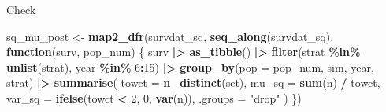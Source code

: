 \documentclass[
]{article}
\newenvironment{Shaded}{\begin{snugshade}}{\end{snugshade}}
\newcommand{\AttributeTok}[1]{\textcolor[rgb]{0.13,0.29,0.53}{#1}}
\newcommand{\ControlFlowTok}[1]{\textcolor[rgb]{0.13,0.29,0.53}{\textbf{#1}}}
\newcommand{\DecValTok}[1]{\textcolor[rgb]{0.00,0.00,0.81}{#1}}
\newcommand{\FunctionTok}[1]{\textcolor[rgb]{0.13,0.29,0.53}{\textbf{#1}}}
\newcommand{\NormalTok}[1]{#1}
\newcommand{\OtherTok}[1]{\textcolor[rgb]{0.56,0.35,0.01}{#1}}
\newcommand{\SpecialCharTok}[1]{\textcolor[rgb]{0.81,0.36,0.00}{\textbf{#1}}}
\newcommand{\StringTok}[1]{\textcolor[rgb]{0.31,0.60,0.02}{#1}}
\begin{document}
Check

\begin{Shaded}
\begin{Highlighting}[]
\NormalTok{sq\_mu\_post }\OtherTok{\textless{}{-}} \FunctionTok{map2\_dfr}\NormalTok{(survdat\_sq, }\FunctionTok{seq\_along}\NormalTok{(survdat\_sq), }\ControlFlowTok{function}\NormalTok{(surv, pop\_num) \{}
\NormalTok{  surv }\SpecialCharTok{|\textgreater{}}
    \FunctionTok{as\_tibble}\NormalTok{() }\SpecialCharTok{|\textgreater{}}
    \FunctionTok{filter}\NormalTok{(strat }\SpecialCharTok{\%in\%} \FunctionTok{unlist}\NormalTok{(strat), year }\SpecialCharTok{\%in\%} \DecValTok{6}\SpecialCharTok{:}\DecValTok{15}\NormalTok{) }\SpecialCharTok{|\textgreater{}}
    \FunctionTok{group\_by}\NormalTok{(}\AttributeTok{pop =}\NormalTok{ pop\_num, sim, year, strat) }\SpecialCharTok{|\textgreater{}}
    \FunctionTok{summarise}\NormalTok{(}
      \AttributeTok{towct =} \FunctionTok{n\_distinct}\NormalTok{(set),}
      \AttributeTok{mu\_sq =} \FunctionTok{sum}\NormalTok{(n) }\SpecialCharTok{/}\NormalTok{ towct,}
      \AttributeTok{var\_sq =} \FunctionTok{ifelse}\NormalTok{(towct }\SpecialCharTok{\textless{}} \DecValTok{2}\NormalTok{, }\DecValTok{0}\NormalTok{, }\FunctionTok{var}\NormalTok{(n)),}
      \AttributeTok{.groups =} \StringTok{"drop"}
\NormalTok{    )}
\NormalTok{\})}


\end{Highlighting}
\end{Shaded}
\end{document}
